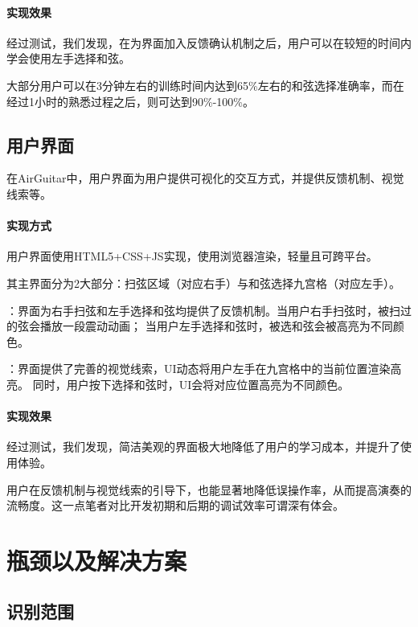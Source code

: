             \paragraph{实现效果} 经过测试，我们发现，在为界面加入反馈确认机制之后，用户可以在较短的时间内学会使用左手选择和弦。

            大部分用户可以在3分钟左右的训练时间内达到65\%左右的和弦选择准确率，而在经过1小时的熟悉过程之后，则可达到90\%-100\%。

        \subsection{用户界面}
        在AirGuitar中，用户界面为用户提供可视化的交互方式，并提供反馈机制、视觉线索等。

            \paragraph{实现方式} 用户界面使用HTML5+CSS+JS实现，使用浏览器渲染，轻量且可跨平台。

            其主界面分为2大部分：扫弦区域（对应右手）与和弦选择九宫格（对应左手）。

            \begin{enumerate}
                ：界面为右手扫弦和左手选择和弦均提供了反馈机制。当用户右手扫弦时，被扫过的弦会播放一段震动动画；
                当用户左手选择和弦时，被选和弦会被高亮为不同颜色。

                ：界面提供了完善的视觉线索，UI动态将用户左手在九宫格中的当前位置渲染高亮。
                同时，用户按下选择和弦时，UI会将对应位置高亮为不同颜色。
            \end{enumerate}

            \paragraph{实现效果} 经过测试，我们发现，简洁美观的界面极大地降低了用户的学习成本，并提升了使用体验。

            用户在反馈机制与视觉线索的引导下，也能显著地降低误操作率，从而提高演奏的流畅度。这一点笔者对比开发初期和后期的调试效率可谓深有体会。

    \section{瓶颈以及解决方案}

        \subsection{识别范围}

